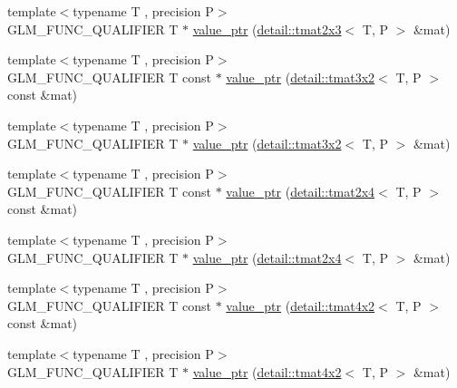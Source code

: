 \begin{DoxyCompactItemize}
\item 
{\footnotesize template$<$typename T , precision P$>$ }\\G\-L\-M\-\_\-\-F\-U\-N\-C\-\_\-\-Q\-U\-A\-L\-I\-F\-I\-E\-R T $\ast$ \hyperlink{group__gtc__type__ptr_gaaba8179ff5559d8b4493499313eb7a02}{value\-\_\-ptr} (\hyperlink{structglm_1_1detail_1_1tmat2x3}{detail\-::tmat2x3}$<$ T, P $>$ \&mat)
\item 
{\footnotesize template$<$typename T , precision P$>$ }\\G\-L\-M\-\_\-\-F\-U\-N\-C\-\_\-\-Q\-U\-A\-L\-I\-F\-I\-E\-R T const $\ast$ \hyperlink{group__gtc__type__ptr_gaf8edbe29063a5b8221fc8afcb6af224d}{value\-\_\-ptr} (\hyperlink{structglm_1_1detail_1_1tmat3x2}{detail\-::tmat3x2}$<$ T, P $>$ const \&mat)
\item 
{\footnotesize template$<$typename T , precision P$>$ }\\G\-L\-M\-\_\-\-F\-U\-N\-C\-\_\-\-Q\-U\-A\-L\-I\-F\-I\-E\-R T $\ast$ \hyperlink{group__gtc__type__ptr_gae2e604002202417c7156db3deeb1301d}{value\-\_\-ptr} (\hyperlink{structglm_1_1detail_1_1tmat3x2}{detail\-::tmat3x2}$<$ T, P $>$ \&mat)
\item 
{\footnotesize template$<$typename T , precision P$>$ }\\G\-L\-M\-\_\-\-F\-U\-N\-C\-\_\-\-Q\-U\-A\-L\-I\-F\-I\-E\-R T const $\ast$ \hyperlink{group__gtc__type__ptr_ga7b738eac576043c00c39bda2fc515d7b}{value\-\_\-ptr} (\hyperlink{structglm_1_1detail_1_1tmat2x4}{detail\-::tmat2x4}$<$ T, P $>$ const \&mat)
\item 
{\footnotesize template$<$typename T , precision P$>$ }\\G\-L\-M\-\_\-\-F\-U\-N\-C\-\_\-\-Q\-U\-A\-L\-I\-F\-I\-E\-R T $\ast$ \hyperlink{group__gtc__type__ptr_ga59b17271f4f487e556383b715f9b8534}{value\-\_\-ptr} (\hyperlink{structglm_1_1detail_1_1tmat2x4}{detail\-::tmat2x4}$<$ T, P $>$ \&mat)
\item 
{\footnotesize template$<$typename T , precision P$>$ }\\G\-L\-M\-\_\-\-F\-U\-N\-C\-\_\-\-Q\-U\-A\-L\-I\-F\-I\-E\-R T const $\ast$ \hyperlink{group__gtc__type__ptr_ga73acc0dbfeeb9e6c09df1f79fd990b84}{value\-\_\-ptr} (\hyperlink{structglm_1_1detail_1_1tmat4x2}{detail\-::tmat4x2}$<$ T, P $>$ const \&mat)
\item 
{\footnotesize template$<$typename T , precision P$>$ }\\G\-L\-M\-\_\-\-F\-U\-N\-C\-\_\-\-Q\-U\-A\-L\-I\-F\-I\-E\-R T $\ast$ \hyperlink{group__gtc__type__ptr_ga478c7dc470b36836ac5392e852fd2348}{value\-\_\-ptr} (\hyperlink{structglm_1_1detail_1_1tmat4x2}{detail\-::tmat4x2}$<$ T, P $>$ \&mat)

\end{DoxyCompactItemize}
